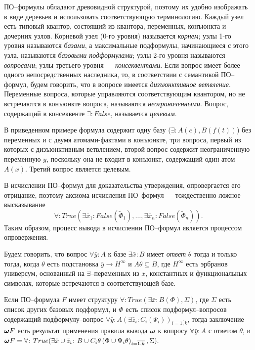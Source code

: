 \documentclass[a4paper]{report}
\begin{document}
ПО--формулы обладают древовидной структурой, поэтому их удобно изображать в виде деревьев и использовать соответствующую терминологию. Каждый узел есть типовый квантор, состоящий из квантора, переменных, конъюнкта и дочерних узлов. Корневой узел (0-го уровня) называется \emph{корнем}; узлы 1-го уровня называются \emph{базами}, а максимальные подформулы, начинающиеся с этого узла, называются \emph{базовыми подформулами}; узлы 2-го уровня называются \emph{вопросами}; узлы третьего уровня --- \emph{консеквентами}. Если вопрос имеет более одного непосредственных наследника, то, в соответствии с семантикой ПО--формул, будем говорить, что в вопросе имеется \emph{дизъюнктивное ветвление}. Переменные вопроса, которые управляются соответствующим квантором, но не встречаются в конъюнкте вопроса, называются \emph{неограниченными}. Вопрос, содержащий в консеквенте $\exists\colon False$, называется \emph{целевым}.

В приведенном примере формула содержит одну базу ($\exists\colon A(e),B(f(t))$) без переменных и с двумя атомами-фактами в конъюнкте, три вопроса, первый из которых с дизъюнктивным ветвлением, второй вопрос содержит неограниченную переменную $y$, поскольку она не входит в конъюнкт, содержащий один атом $A(x)$. Третий вопрос является целевым. %

В исчислении ПО--формул для доказательства утверждения, опровергается его отрицание, поэтому аксиома исчисления ПО--формул ---  тождественно ложное высказывание $$\forall\colon True\left(\exists \bar{x}_1\colon False\left(\widetilde{\Phi}_1\right),\ldots,\exists \bar{x}_n\colon False\left(\widetilde{\Phi}_n\right)\right).$$ Таким образом, процесс вывода в исчислении ПО--формул является процессом опровержения.

Будем говорить, что вопрос $\forall \bar{y}\colon A$ к базе $\exists \bar{x}\colon B$ имеет {\em ответ} $\theta$  тогда и только тогда, когда $\theta$ есть подстановка $\bar{y} \rightarrow H^{\infty}$ и $A\theta \subseteq B$, где $H^{\infty}$ есть эрбранов универсум, основанный на $\exists$--переменных из $\bar{x}$, константных и функциональных символах, которые встречаются в соответствующей базе.

Если ПО--формула $F$ имеет структуру $\forall\colon True\left(\exists \bar{x}\colon B\left(\Phi\right),\Sigma\right)$, где $\Sigma$ есть список других базовых подформул, и $\Phi$ есть список подформул--вопросов содержащий подформулу--вопрос $\forall \bar{y}\colon A(\exists \bar{z}_i\colon C_i\left(\Psi_i\right))_{i=\overline{1,k}}$, тогда заключение $\boldsymbol{\omega} F$ есть результат применения правила вывода $\boldsymbol{\omega}$ к вопросу $\forall \bar{y}\colon A$ с ответом $\theta$, и $\boldsymbol{\omega} F = \forall\colon True(\exists \bar{x} \cup \bar{z}_i\colon B \cup C_i\theta\left(\Phi \cup \Psi_i\theta\right)_{i=\overline{1,k}},\Sigma).$
\end{document}
